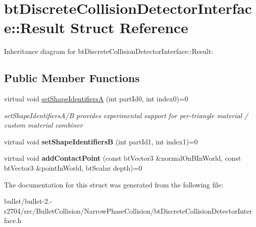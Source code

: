 \hypertarget{structbt_discrete_collision_detector_interface_1_1_result}{\section{bt\+Discrete\+Collision\+Detector\+Interface\+:\+:Result Struct Reference}
\label{structbt_discrete_collision_detector_interface_1_1_result}
}


Inheritance diagram for bt\+Discrete\+Collision\+Detector\+Interface\+:\+:Result\+:
\subsection*{Public Member Functions}
\begin{DoxyCompactItemize}
\item 
\hypertarget{structbt_discrete_collision_detector_interface_1_1_result_a09a94d4714f153a138cd3a9c12b33588}{virtual void \hyperlink{structbt_discrete_collision_detector_interface_1_1_result_a09a94d4714f153a138cd3a9c12b33588}{set\+Shape\+Identifiers\+A} (int part\+Id0, int index0)=0}\label{structbt_discrete_collision_detector_interface_1_1_result_a09a94d4714f153a138cd3a9c12b33588}

\begin{DoxyCompactList}\small\item\em set\+Shape\+Identifiers\+A/\+B provides experimental support for per-\/triangle material / custom material combiner \end{DoxyCompactList}\item 
\hypertarget{structbt_discrete_collision_detector_interface_1_1_result_a13bc80575335dd02ab74fc873cb274b4}{virtual void {\bfseries set\+Shape\+Identifiers\+B} (int part\+Id1, int index1)=0}\label{structbt_discrete_collision_detector_interface_1_1_result_a13bc80575335dd02ab74fc873cb274b4}

\item 
\hypertarget{structbt_discrete_collision_detector_interface_1_1_result_a7097b0d4919b1655f63e7b7dea2879d9}{virtual void {\bfseries add\+Contact\+Point} (const bt\+Vector3 \&normal\+On\+B\+In\+World, const bt\+Vector3 \&point\+In\+World, bt\+Scalar depth)=0}\label{structbt_discrete_collision_detector_interface_1_1_result_a7097b0d4919b1655f63e7b7dea2879d9}

\end{DoxyCompactItemize}


The documentation for this struct was generated from the following file\+:\begin{DoxyCompactItemize}
\item 
bullet/bullet-\/2.-\/r2704/src/\+Bullet\+Collision/\+Narrow\+Phase\+Collision/bt\+Discrete\+Collision\+Detector\+Interface.\+h\end{DoxyCompactItemize}
